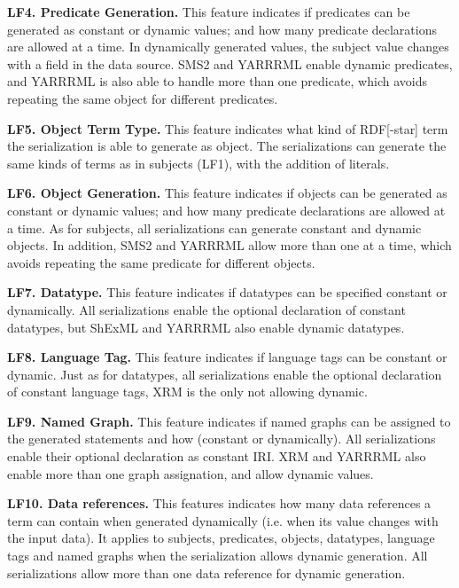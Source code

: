 \textbf{LF4. Predicate Generation.}
This feature indicates if predicates can be generated as constant or dynamic values; and how many predicate declarations are allowed at a time. In dynamically generated values, the subject value changes with a field in the data source. 
SMS2 and YARRRML enable dynamic predicates, and YARRRML is also able to handle more than one predicate, which avoids repeating the same object for different predicates.

\textbf{LF5. Object Term Type.} 
This feature indicates what kind of RDF[-star] term the serialization is able to generate as object. The serializations can generate the same kinds of terms as in subjects (LF1), with the addition of literals. 

\textbf{LF6. Object Generation.}
This feature indicates if objects can be generated as constant or dynamic values; and how many predicate declarations are allowed at a time.
As for subjects, all serializations can generate constant and dynamic objects. In addition, SMS2 and YARRRML allow more than one at a time, which avoids repeating the same predicate for different objects.

\textbf{LF7. Datatype.}
This feature indicates if datatypes can be specified constant or dynamically.
All serializations enable the optional declaration of constant datatypes, but ShExML and YARRRML also enable dynamic datatypes.

\textbf{LF8. Language Tag.}
This feature indicates if language tags can be constant or dynamic. Just as for datatypes, all serializations enable the optional declaration of constant language tags, XRM is the only not allowing dynamic.

\textbf{LF9. Named Graph.} 
This feature indicates if named graphs can be assigned to the generated statements and how (constant or dynamically). 
All serializations enable their optional declaration as constant IRI. XRM and YARRRML also enable more than one graph assignation, and allow dynamic values. 

\textbf{LF10. Data references.} 
This features indicates how many data references a term can contain when generated dynamically (i.e. when its value changes with the input data). It applies to subjects, predicates, objects, datatypes, language tags and named graphs when the serialization allows dynamic generation. All serializations allow more than one data reference for dynamic generation.

